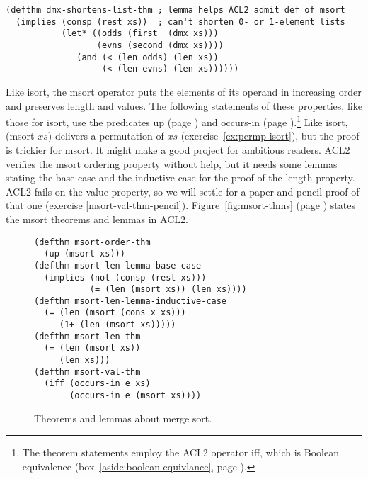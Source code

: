 \label{defthm:dmx-shortens-list}
\begin{code}
\begin{verbatim}
(defthm dmx-shortens-list-thm ; lemma helps ACL2 admit def of msort
  (implies (consp (rest xs))  ; can't shorten 0- or 1-element lists
           (let* ((odds (first  (dmx xs)))
                  (evns (second (dmx xs))))
              (and (< (len odds) (len xs))
                   (< (len evns) (len xs))))))
\end{verbatim}
\end{code}

Like \textsf{isort}, the \textsf{msort} operator puts the elements of its operand
in increasing order and preserves length and values.
The following statements of these properties, like those for \textsf{isort},
use the predicates \textsf{up} (page \pageref{defun:up})
and \textsf{occurs-in} (page \pageref{def:occurs-in}).\footnote{The
theorem statements employ the ACL2 operator \textsf{iff}, which is
Boolean equivalence
(box~\ref{aside:boolean-equivlance}, page \pageref{aside:boolean-equivlance}).}
Like \textsf{isort}, \textsf{(msort $xs$)} delivers a permutation of $xs$
(exercise~\ref{ex:permp-isort}), but the proof is trickier for \textsf{msort}.
It might make a good project for ambitious readers.
ACL2 verifies the \textsf{msort} ordering property without help,
but it needs some lemmas stating the base case and the inductive case for
the proof of the length property.
ACL2 fails on the value property, so
we will settle for a paper-and-pencil proof of that one
(exercise \ref{msort-val-thm-pencil}).
Figure~\ref{fig:msort-thms} (page \pageref{fig:msort-thms})
states the \textsf{msort} theorems and lemmas in ACL2.

\begin{figure}
\begin{code}
\begin{verbatim}
(defthm msort-order-thm
  (up (msort xs)))
(defthm msort-len-lemma-base-case
  (implies (not (consp (rest xs)))
           (= (len (msort xs)) (len xs))))
(defthm msort-len-lemma-inductive-case
  (= (len (msort (cons x xs)))
     (1+ (len (msort xs)))))
(defthm msort-len-thm
  (= (len (msort xs))
     (len xs)))
(defthm msort-val-thm
  (iff (occurs-in e xs)
       (occurs-in e (msort xs))))
\end{verbatim}
\end{code}
\label{defthm:msort-len}\label{defthm:msort-val}
\caption{Theorems and lemmas about merge sort.}
\label{fig:msort-thms}
\label{defthm:msort-ord}
\end{figure}

